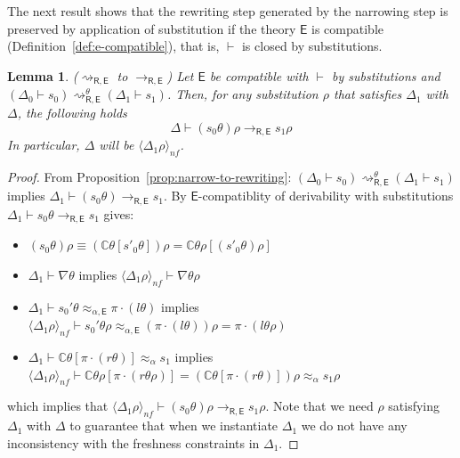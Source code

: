 \documentclass[11pt,a4paper]{amsart}
\newcommand{\aleq}{\approx_{\alpha}}
\newcommand{\ealeq}{\approx_{\alpha,\theory{E}}}
\newcommand{\nfpair}[1]{\langle #1\rangle_{nf}}
\newcommand{\theory}[1]{\ensuremath{\mathsf{#1}}}
\newcommand{\context}[1]{\mathbb{C}}
\theoremstyle{plain}
\newtheorem{lemma}[theorem]{Lemma}
\theoremstyle{definition}
\theoremstyle{remark}
\begin{document}
The next result shows that the rewriting step generated by the narrowing step
is preserved by application of substitution if the theory \theory{E} is compatible (Definition~\ref{def:e-compatible}), that is, $\vdash$ is closed by substitutions.
\begin{lemma}{($\rightsquigarrow_{\theory{R,E}}$ to $\to_{\theory{R,E}}$)}
\label{lem:correctness}
Let \theory{E} be compatible with $\vdash$ by substitutions and  $(\Delta_0 \vdash s_0) \rightsquigarrow_{\theory{R,E}}^\theta (\Delta_1 \vdash s_1) $. Then, for any substitution $\rho$ that satisfies $\Delta_1$ with $\Delta$,
the following holds
$$\Delta \vdash (s_0 \theta )\rho \rightarrow_{\theory{R,E}}  s_1 \rho$$
In particular, $\Delta$ will be $\nfpair{\Delta_1\rho}$.
\end{lemma}
\begin{proof}
From Proposition~\ref{prop:narrow-to-rewriting}:
$(\Delta_0\vdash s_0) \rightsquigarrow_{\theory{R,E}}^{\theta} (\Delta_1 \vdash s_1) $ implies $\Delta_1\vdash (s_0 \theta ) \rightarrow_{\theory{R,E}}  s_1 $.
By \theory{E}-compatiblity of derivability with substitutions $\Delta_1 \vdash s_0\theta \rightarrow_{\theory{R,E}} s_1$ gives: 

\begin{itemize}
    \item $(s_0\theta)\rho \equiv (\context{C}\theta[s'_0\theta])\rho = \context{C}\theta\rho[(s'_0\theta)\rho]$
    \item $\Delta_1 \vdash \nabla\theta$ implies  $\nfpair{\Delta_1\rho} \vdash \nabla\theta\rho$
    \item $\Delta_1 \vdash s_0'\theta \ealeq \pi\cdot (l\theta)$ implies $\nfpair{\Delta_1\rho} \vdash s_0'\theta\rho \ealeq (\pi\cdot(l\theta))\rho = \pi\cdot(l\theta\rho)$
    \item $\Delta_1 \vdash \context{C}\theta[\pi\cdot(r\theta)] \aleq s_1$ implies $\nfpair{\Delta_1\rho} \vdash \context{C}\theta\rho[\pi\cdot(r\theta\rho)] = (\context{C}\theta[\pi\cdot(r\theta)])\rho \aleq s_1\rho$
\end{itemize}
which implies that $\nfpair{\Delta_1\rho} \vdash (s_0\theta)\rho \rightarrow_{\theory{R,E}} s_1\rho$.
Note that we need $\rho$ satisfying $\Delta_1$ with $\Delta$ to guarantee that when we instantiate $\Delta_1$ we do not have any inconsistency with the freshness constraints in $\Delta_1$.
\end{proof}
\end{document}
